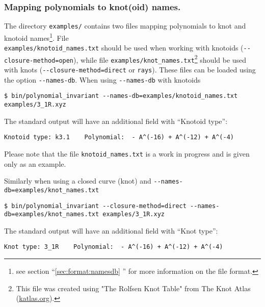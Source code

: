 \subsubsection{Mapping polynomials to knot(oid) names.}
The directory \lstinline{examples/} contains two files mapping polynomials to knot and knotoid names\footnote{see section ``\ref{sec:format:namesdb} '' for more information on the file format.}. File\\
\lstinline{examples/knotoid_names.txt} should be used when working with knotoids (\lstinline{--closure-method=open}), while file \lstinline{examples/knot_names.txt}\footnote{This file was created using "The Rolfsen Knot Table" from The Knot Atlas (\url{katlas.org}).} should be used with knots (\lstinline{--closure-method=direct} or \lstinline{rays}). 
These files can be loaded using the option  \lstinline{--names-db}. When using \lstinline{--names-db} with knotoids
\begin{lstlisting}
$ bin/polynomial_invariant --names-db=examples/knotoid_names.txt examples/3_1R.xyz
\end{lstlisting}
The standard output will have an additional field with ``Knotoid type'':
\begin{lstlisting}
Knotoid type: k3.1    Polynomial:  - A^(-16) + A^(-12) + A^(-4)
\end{lstlisting}
Please note that the file \lstinline{knotoid_names.txt} is a work in progress and is given only as an example.

Similarly when using a closed curve (knot) and \lstinline{--names-db=examples/knot_names.txt}
\begin{lstlisting}
$ bin/polynomial_invariant --closure-method=direct --names-db=examples/knot_names.txt examples/3_1R.xyz
\end{lstlisting}
The standard output will have an additional field with ``Knot type'':
\begin{lstlisting}
Knot type: 3_1R    Polynomial:  - A^(-16) + A^(-12) + A^(-4)
\end{lstlisting}


